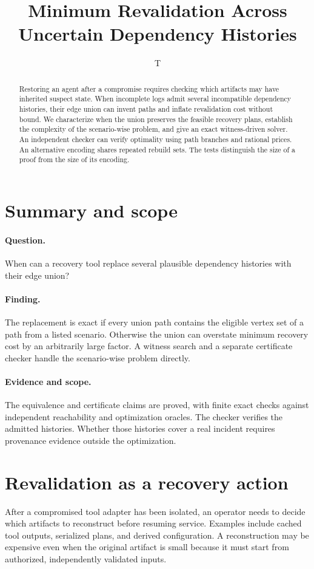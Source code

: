 \documentclass[11pt]{article}
\title{Minimum Revalidation Across Uncertain Dependency Histories}
\author{T}
\date{}
\begin{document}
\maketitle
\begin{abstract}
Restoring an agent after a compromise requires checking which artifacts
may have inherited suspect state. When incomplete logs admit several
incompatible dependency histories, their edge union can invent paths and
inflate revalidation cost without bound. We characterize when the union
preserves the feasible recovery plans, establish the complexity of the
scenario-wise problem, and give an exact witness-driven solver. An
independent checker can verify optimality using path branches and
rational prices. An alternative encoding shares repeated rebuild
sets. The tests distinguish the size of a proof from the size of
its encoding.
\end{abstract}

\section*{Summary and scope}
\paragraph{Question.} When can a recovery tool replace several
plausible dependency histories with their edge union?
\paragraph{Finding.} The replacement is exact if every union path
contains the eligible vertex set of a path from a listed scenario.
Otherwise the union can overstate minimum recovery
cost by an arbitrarily large factor. A witness search and a separate
certificate checker handle the scenario-wise problem directly.
\paragraph{Evidence and scope.} The equivalence and certificate
claims are proved, with finite exact checks against independent
reachability and optimization oracles. The checker verifies the
admitted histories. Whether those histories cover a real incident
requires provenance evidence outside the optimization.

\section{Revalidation as a recovery action}
After a compromised tool adapter has been isolated, an operator needs
to decide which artifacts to reconstruct before resuming service.
Examples include cached tool outputs, serialized plans, and derived
configuration. A reconstruction may be expensive even when the original
artifact is small because it must start from authorized, independently
validated inputs.
\end{document}
